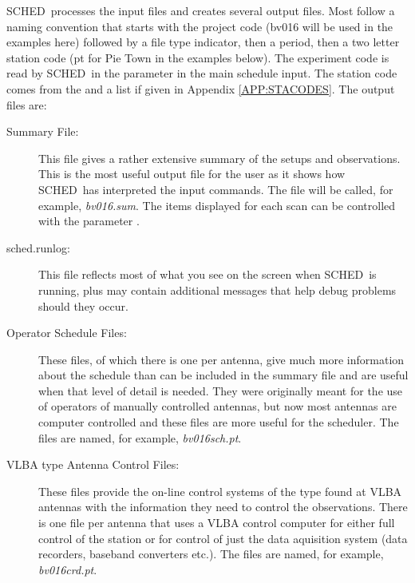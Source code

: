 \documentclass{report}
\newcommand{\schedb}{{\sc SCHED~}}
\begin{document}
\schedb processes the input files and creates several output
files.  Most follow a naming convention that starts with
the project code (bv016 will be used in the examples here) followed
by a file type indicator, then a period, then a two letter station
code (pt for Pie Town in the examples below).  The experiment code
is read by \schedb in the  parameter
in the main schedule input.  The station code comes from the
 and a list if given in
Appendix \ref{APP:STACODES}. The output files are:

\begin{description}

\item[Summary File:] This file gives a rather extensive summary of the
setups and observations.  This is the most useful output file for the
user as it shows how \schedb has interpreted the input commands.  The
file will be called, for example, {\sl bv016.sum}.  The items displayed
for each scan can be controlled with the parameter .

\item[sched.runlog:] This file reflects most of what you see on the
screen when \schedb is running, plus may contain additional messages
that help debug problems should they occur.

\item[Operator Schedule Files:] These files, of which there is one per
antenna, give much more information about the schedule than can be
included in the summary file and are useful when that level of detail
is needed.  They were originally meant for the use of operators of
manually controlled antennas, but now most antennas are computer
controlled and these files are more useful for the scheduler.  The
files are named, for example, {\sl bv016sch.pt}.

\item[VLBA type Antenna Control Files:]  These files provide
the on-line control systems of the type found at VLBA antennas with
the information they need to control the observations.  There is one
file per antenna that uses a VLBA control computer for either full
control of the station or for control of just the data aquisition
system (data recorders, baseband converters etc.).  The files are named,
for example, {\sl bv016crd.pt}.



\end{description}
\end{document}
